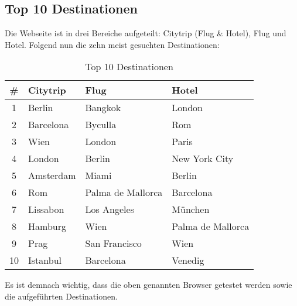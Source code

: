 \subsection{Top 10 Destinationen}
Die Webseite ist in drei Bereiche aufgeteilt: Citytrip (Flug \& Hotel), Flug und Hotel. Folgend nun die zehn meist gesuchten Destinationen:
\begin{table}[H] 
	\caption{Top 10 Destinationen}
	\centering
	\label{sec:Recherche:Zielgruppe:top10}
	
	\begin{tabular}{ | c | l | l | l | } 
		\hline 
		\textbf{\#} & \textbf{Citytrip} & \textbf{Flug} & \textbf{Hotel} \\ \hline 
		1 & Berlin & Bangkok & London \\ \hline
		2 & Barcelona & Byculla & Rom \\ \hline
		3 & Wien & London & Paris \\ \hline
		4 & London & Berlin & New York City \\ \hline
		5 & Amsterdam & Miami & Berlin \\ \hline
		6 & Rom & Palma de Mallorca & Barcelona \\ \hline
		7 & Lissabon & Los Angeles & München \\ \hline
		8 & Hamburg & Wien  & Palma de Mallorca \\ \hline
		9 & Prag & San Francisco & Wien \\ \hline
		10 & Istanbul & Barcelona & Venedig \\ \hline
	\end{tabular} 
\end{table}

Es ist demnach wichtig, dass die oben genannten Browser getestet werden sowie die aufgeführten Destinationen.